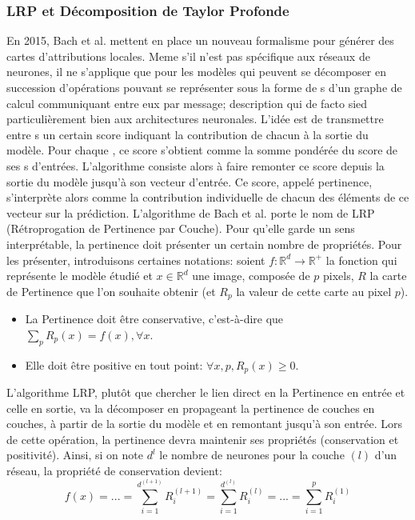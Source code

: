 \subsubsection{LRP et Décomposition de Taylor Profonde}

En 2015, Bach et al. \cite{bachPixelWiseExplanationsNonLinear2015b} mettent en place un nouveau formalisme pour générer des cartes d'attributions locales. Meme s'il n'est pas spécifique aux réseaux de neurones, il ne s'applique que pour les modèles qui peuvent se décomposer en succession d'opérations pouvant se représenter sous la forme de \noeud{}s d'un graphe de calcul communiquant entre eux par message; description qui de facto sied particulièrement bien aux architectures neuronales. L'idée est de transmettre entre \noeud{}s un certain score indiquant la contribution de chacun à la sortie du modèle. Pour chaque \noeud{}, ce score s'obtient comme la somme pondérée du score de ses \noeud{}s d'entrées. L'algorithme consiste alors à faire remonter ce score depuis la sortie du modèle jusqu'à son vecteur d'entrée. Ce score, appelé pertinence, s'interprète alors comme la contribution individuelle de chacun des éléments de ce vecteur sur la prédiction. L'algorithme de Bach et al. porte le nom de \ac{LRP} (Rétroprogation de Pertinence par Couche). Pour qu'elle garde un sens interprétable, la pertinence doit présenter un certain nombre de propriétés. Pour les présenter, introduisons certaines notations: soient $f: \mathbb{R}^d \to \mathbb{R}^+$ la fonction qui représente le modèle étudié et $x \in \mathbb{R}^d$ une image, composée de $p$ pixels, $R$ la carte de Pertinence que l'on souhaite obtenir (et $R_p$ la valeur de cette carte au pixel $p$).
\begin{itemize}
	\item La Pertinence doit être conservative, c'est-à-dire que $\sum_p R_p(x) = f(x), \forall x$.
	\item Elle doit être positive en tout point: $\forall x, p, R_p(x) \geq 0$. 
\end{itemize}
L'algorithme LRP, plutôt que chercher le lien direct en la Pertinence en entrée et celle en sortie, va la décomposer en propageant la pertinence de couches en couches, à partir de la sortie du modèle et en remontant jusqu'à son entrée. Lors de cette opération, la pertinence devra maintenir ses propriétés (conservation et positivité). Ainsi, si on note $d^{l}$ le nombre de neurones pour la couche $(l)$ d'un réseau, la propriété de conservation devient:
\begin{equation}
	f(x) = ... = \sum_{i=1}^{d^{(l+1)}} R^{(l+1)}_i = \sum_{i=1}^{d^{(l)}} R^{(l)}_{i}  = ... = \sum_{i=1}^p  R^{(1)}_i
\end{equation}
